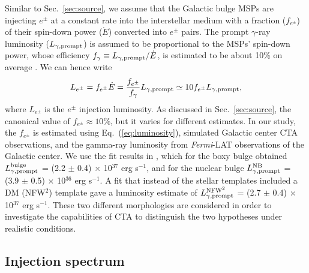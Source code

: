 \documentclass[doublespace,nopageskip]{VTthesis}
\begin{document}
Similar to Sec.~\ref{sec:source}, we assume that the Galactic bulge MSPs are injecting $e^{\pm}$ at a constant rate into the interstellar medium with a fraction ($f_{e^{\pm}}$) of their spin-down power ($\dot E$) converted into $e^{\pm}$ pairs. The prompt $\gamma$-ray luminosity ($L_{\gamma,{\rm prompt}}$) is assumed to be proportional to the MSPs' spin-down power, whose efficiency $f_\gamma \equiv L_{\gamma,{\rm prompt}}/\dot{E}$, is estimated to be about 10\% on average \citep{2013ApJS..208...17A}. We can hence write 
\begin{equation}\label{eq:luminosity}
  L_{e^\pm}=f_{e^\pm}\dot{E}=\frac{f_{e^\pm}}{f_{\gamma}}  L_{\gamma,{\rm prompt}} \simeq 10f_{e^\pm} L_{\gamma,{\rm prompt}},
\end{equation}
where $L_{e^\pm}$ is the $e^\pm$ injection luminosity. As discussed in Sec.~\ref{sec:source}, the canonical value of $f_{e^\pm}\approx 10\%$, but it varies for different estimates. In our study, the $f_{e^\pm}$ is estimated using Eq.~(\ref{eq:luminosity}), simulated Galactic center CTA observations, and the gamma-ray luminosity from \textit{Fermi}-LAT observations of the Galactic center. We use the fit results in \cite{2019JCAP...09..042M}, which for the boxy bulge obtained $L^{\text{bulge}}_{\gamma,{\rm prompt}}$ = (2.2 $\pm$ 0.4) $\times$ 10$^{37}$ erg s$^{-1}$, and for the nuclear bulge $L^{\text{NB}}_{\gamma,{\rm prompt}}$ = (3.9 $\pm$ 0.5) $\times$ 10$^{36}$ erg s$^{-1}$. A fit that instead of the stellar templates included a DM (NFW$^2$) template gave a luminosity estimate of $L^{\text{NFW}^2}_{\gamma,{\rm prompt}}$ = (2.7 $\pm$ 0.4) $\times$ 10$^{37}$ erg s$^{-1}$. These two different morphologies are considered in order to investigate the capabilities of CTA to distinguish the two hypotheses under realistic conditions.

\subsection{Injection spectrum}\label{subsec:spectrum}
\end{document}

